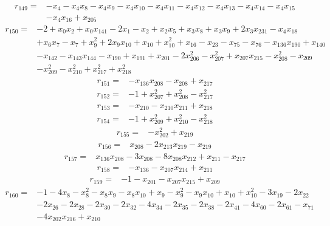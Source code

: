 \[\begin{aligned}
r_{149}={}&-x_{4}-x_{4}x_{8}-x_{4}x_{9}-x_{4}x_{10}-x_{4}x_{11}-x_{4}x_{12}-x_{4}x_{13}-x_{4}x_{14}-x_{4}x_{15}
\\ &-x_{4}x_{16}+x_{205}
\end{aligned}\]
\[\begin{aligned}
r_{150}={}&-2+x_{0}x_{2}+x_{0}x_{141}-2x_{1}-x_{2}+x_{2}x_{5}+x_{3}x_{8}+x_{3}x_{9}+2x_{3}x_{231}-x_{4}x_{18}
\\ &+x_{6}x_{7}-x_{7}+x_{9}^{2}+2x_{9}x_{10}+x_{10}+x_{10}^{2}+x_{16}-x_{23}-x_{75}-x_{76}-x_{136}x_{190}+x_{140}
\\ &-x_{142}-x_{143}x_{144}-x_{190}+x_{191}+x_{201}-2x_{206}^{2}-x_{207}^{2}+x_{207}x_{215}-x_{208}^{2}-x_{209}
\\ &-x_{209}^{2}-x_{210}^{2}+x_{217}^{2}+x_{218}^{2}
\end{aligned}\]
\[\begin{aligned}
r_{151}={}&-x_{136}x_{208}-x_{208}+x_{217}
\end{aligned}\]
\[\begin{aligned}
r_{152}={}&-1+x_{207}^{2}+x_{208}^{2}-x_{217}^{2}
\end{aligned}\]
\[\begin{aligned}
r_{153}={}&-x_{210}-x_{210}x_{211}+x_{218}
\end{aligned}\]
\[\begin{aligned}
r_{154}={}&-1+x_{209}^{2}+x_{210}^{2}-x_{218}^{2}
\end{aligned}\]
\[\begin{aligned}
r_{155}={}&-x_{202}^{2}+x_{219}
\end{aligned}\]
\[\begin{aligned}
r_{156}={}&x_{208}-2x_{213}x_{219}-x_{219}
\end{aligned}\]
\[\begin{aligned}
r_{157}={}&x_{136}x_{208}-3x_{208}-8x_{208}x_{212}+x_{211}-x_{217}
\end{aligned}\]
\[\begin{aligned}
r_{158}={}&-x_{136}-x_{207}x_{214}+x_{211}
\end{aligned}\]
\[\begin{aligned}
r_{159}={}&-1-x_{201}-x_{207}x_{215}+x_{209}
\end{aligned}\]
\[\begin{aligned}
r_{160}={}&-1-4x_{8}-x_{8}^{2}-x_{8}x_{9}-x_{8}x_{10}+x_{9}-x_{9}^{2}-x_{9}x_{10}+x_{10}+x_{10}^{2}-3x_{19}-2x_{22}
\\ &-2x_{26}-2x_{28}-2x_{30}-2x_{32}-4x_{34}-2x_{35}-2x_{38}-2x_{41}-4x_{60}-2x_{61}-x_{71}
\\ &-4x_{202}x_{216}+x_{210}
\end{aligned}\]
